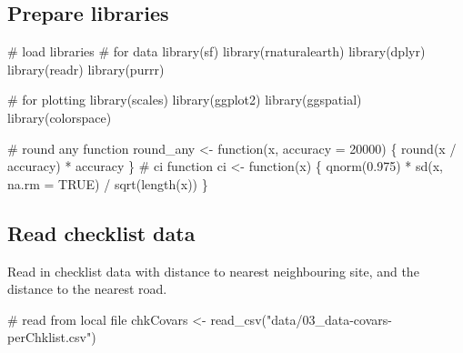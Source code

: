 \documentclass[
]{article}
\newenvironment{Shaded}{}{}
\newcommand{\CommentTok}[1]{\textcolor[rgb]{0.00,0.50,0.00}{#1}}
\newcommand{\ControlFlowTok}[1]{\textcolor[rgb]{0.00,0.00,1.00}{#1}}
\newcommand{\DataTypeTok}[1]{#1}
\newcommand{\DecValTok}[1]{#1}
\newcommand{\FloatTok}[1]{#1}
\newcommand{\KeywordTok}[1]{\textcolor[rgb]{0.00,0.00,1.00}{#1}}
\newcommand{\NormalTok}[1]{#1}
\newcommand{\OperatorTok}[1]{#1}
\newcommand{\OtherTok}[1]{\textcolor[rgb]{1.00,0.25,0.00}{#1}}
\newcommand{\StringTok}[1]{\textcolor[rgb]{0.00,0.50,0.50}{#1}}
\begin{document}
\hypertarget{prepare-libraries-3}{%
\subsection{Prepare libraries}\label{prepare-libraries-3}}

\begin{Shaded}
\begin{Highlighting}[]
\CommentTok{# load libraries}
\CommentTok{# for data}
\KeywordTok{library}\NormalTok{(sf)}
\KeywordTok{library}\NormalTok{(rnaturalearth)}
\KeywordTok{library}\NormalTok{(dplyr)}
\KeywordTok{library}\NormalTok{(readr)}
\KeywordTok{library}\NormalTok{(purrr)}

\CommentTok{# for plotting}
\KeywordTok{library}\NormalTok{(scales)}
\KeywordTok{library}\NormalTok{(ggplot2)}
\KeywordTok{library}\NormalTok{(ggspatial)}
\KeywordTok{library}\NormalTok{(colorspace)}

\CommentTok{# round any function}
\NormalTok{round_any <-}\StringTok{ }\ControlFlowTok{function}\NormalTok{(x, }\DataTypeTok{accuracy =} \DecValTok{20000}\NormalTok{) \{}
  \KeywordTok{round}\NormalTok{(x }\OperatorTok{/}\StringTok{ }\NormalTok{accuracy) }\OperatorTok{*}\StringTok{ }\NormalTok{accuracy}
\NormalTok{\}}
\CommentTok{# ci function}
\NormalTok{ci <-}\StringTok{ }\ControlFlowTok{function}\NormalTok{(x) \{}
  \KeywordTok{qnorm}\NormalTok{(}\FloatTok{0.975}\NormalTok{) }\OperatorTok{*}\StringTok{ }\KeywordTok{sd}\NormalTok{(x, }\DataTypeTok{na.rm =} \OtherTok{TRUE}\NormalTok{) }\OperatorTok{/}\StringTok{ }\KeywordTok{sqrt}\NormalTok{(}\KeywordTok{length}\NormalTok{(x))}
\NormalTok{\}}
\end{Highlighting}
\end{Shaded}

\hypertarget{read-checklist-data}{%
\subsection{Read checklist data}\label{read-checklist-data}}

Read in checklist data with distance to nearest neighbouring site, and the distance to the nearest road.

\begin{Shaded}
\begin{Highlighting}[]
\CommentTok{# read from local file}
\NormalTok{chkCovars <-}\StringTok{ }\KeywordTok{read_csv}\NormalTok{(}\StringTok{"data/03_data-covars-perChklist.csv"}\NormalTok{)}
\end{Highlighting}
\end{Shaded}
\end{document}
